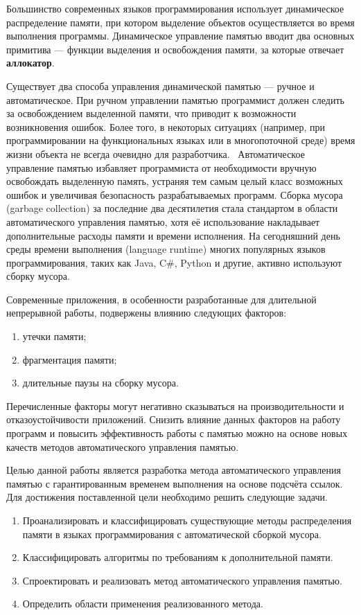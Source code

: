 Большинство современных языков программирования использует динамическое распределение памяти, при котором выделение объектов осуществляется во время выполнения программы. Динамическое управление памятью вводит два основных примитива --- функции выделения и освобождения памяти, за которые отвечает \textbf{аллокатор}. 

Существует два способа управления динамической памятью --- ручное и автоматическое. При ручном управлении памятью программист должен следить за освобождением выделенной памяти, что приводит к возможности возникновения ошибок. Более того, в некоторых ситуациях (например, при программировании на функциональных языках или в многопоточной среде) время жизни объекта не всегда очевидно для разработчика.~\cite{elixir} Автоматическое управление памятью избавляет программиста от необходимости вручную освобождать выделенную память, устраняя тем самым целый класс возможных ошибок и увеличивая безопасность разрабатываемых программ. Сборка мусора (garbage collection) за последние два десятилетия стала стандартом в области автоматического управления памятью, хотя её использование накладывает дополнительные расходы памяти и времени исполнения. На сегодняшний день среды времени выполнения (language runtime) многих популярных языков программирования, таких как Java, C\#, Python и другие, активно используют сборку мусора. 

Современные приложения, в особенности разработанные для длительной непрерывной работы, подвержены влиянию следующих факторов: 
\begin{enumerate}[label*=\arabic*)]
	\item утечки памяти;
	\item фрагментация памяти;
	\item длительные паузы на сборку мусора.
\end{enumerate}
Перечисленные факторы могут негативно сказываться на производительности и отказоустойчивости приложений. Снизить влияние данных факторов на работу программ и повысить эффективность работы с памятью можно на основе новых качеств методов автоматического управления памятью.

Целью данной работы является разработка метода автоматического управления памятью с гарантированным временем выполнения на основе подсчёта ссылок. Для достижения поставленной цели необходимо решить следующие задачи.

\begin{enumerate}[label*=\arabic*.]
	\item Проанализировать и классифицировать существующие методы распределения памяти в языках программирования с автоматической сборкой мусора.
	\item Классифицировать алгоритмы по требованиям к дополнительной памяти.
	\item Спроектировать и реализовать метод автоматического управления памятью.
	\item Определить области применения реализованного метода. 
\end{enumerate}
